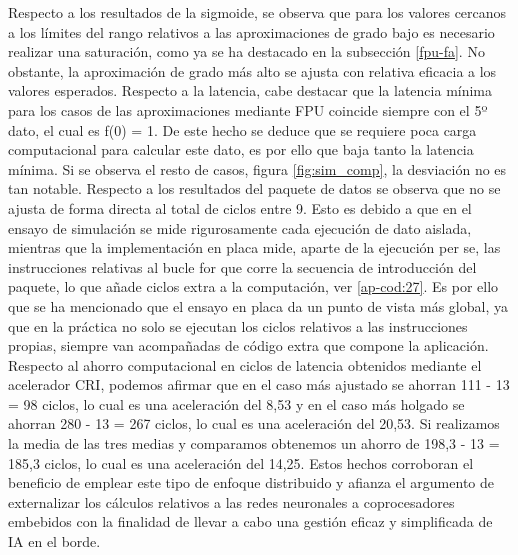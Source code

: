 Respecto a los resultados de la sigmoide, se observa que para los valores cercanos a los límites del rango relativos a las aproximaciones de grado bajo es necesario realizar una saturación, como ya se ha destacado en la subsección \ref{fpu-fa}.
No obstante, la aproximación de grado más alto se ajusta con relativa eficacia a los valores esperados.
Respecto a la latencia, cabe destacar que la latencia mínima para los casos de las aproximaciones mediante FPU coincide siempre con el 5º dato, el cual es f(0) = 1.
De este hecho se deduce que se requiere poca carga computacional para calcular este dato, es por ello que baja tanto la latencia mínima.
Si se observa el resto de casos, figura \ref{fig:sim_comp}, la desviación no es tan notable.
Respecto a los resultados del paquete de datos se observa que no se ajusta de forma directa al total de ciclos entre 9.
Esto es debido a que en el ensayo de simulación se mide rigurosamente cada ejecución de dato aislada, mientras que la implementación en placa mide, aparte de la ejecución per se, las instrucciones relativas al bucle for que corre la secuencia de introducción del paquete, lo que añade ciclos extra a la computación, ver \ref{ap-cod:27}.
Es por ello que se ha mencionado que el ensayo en placa da un punto de vista más global, ya que en la práctica no solo se ejecutan los ciclos relativos a las instrucciones propias, siempre van acompañadas de código extra que compone la aplicación.
Respecto al ahorro computacional en ciclos de latencia obtenidos mediante el acelerador CRI, podemos afirmar que en el caso más ajustado se ahorran 111 - 13 = 98 ciclos, lo cual es una aceleración del 8,53 y en el caso más holgado se ahorran 280 - 13 = 267 ciclos, lo cual es una aceleración del 20,53.
Si realizamos la media de las tres medias y comparamos obtenemos un ahorro de 198,3 - 13 = 185,3 ciclos, lo cual es una aceleración del 14,25.
Estos hechos corroboran el beneficio de emplear este tipo de enfoque distribuido y afianza el argumento de externalizar los cálculos relativos a las redes neuronales a coprocesadores embebidos con la finalidad de llevar a cabo una gestión eficaz y simplificada de IA en el borde.




